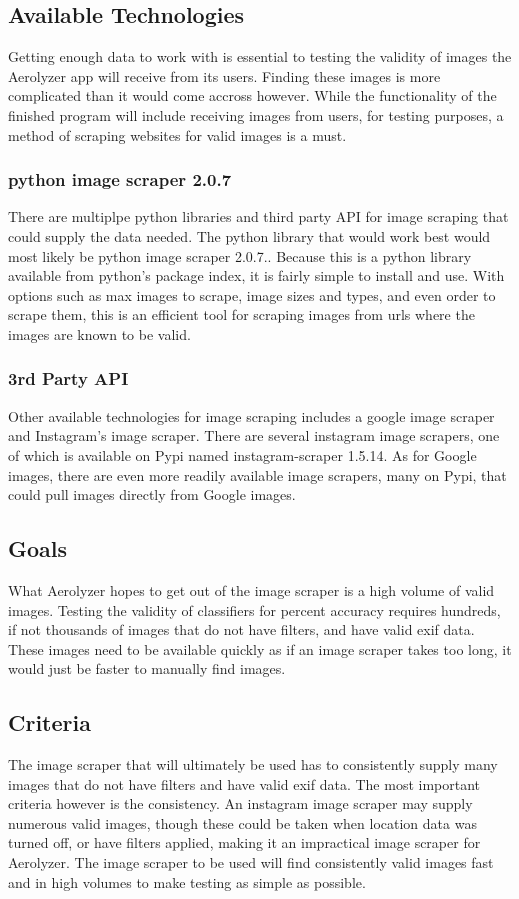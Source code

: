 \documentclass[onecolumn, draftclsnofoot,10pt, compsoc]{IEEEtran}
\begin{document}
\begin{singlespace}
\subsection{Available Technologies}
Getting enough data to work with is essential to testing the validity of images the Aerolyzer app will receive from its users. Finding these images is more complicated than it would come accross however. While the functionality of the finished program will include receiving images from users, for testing purposes, a method of scraping websites for valid images is a must. \cite{img}

\subsubsection{python image scraper 2.0.7}
There are multiplpe python libraries and third party API for image scraping that could supply the data needed. The python library that would work best would most likely be python image scraper 2.0.7.. Because this is a python library available from python's package index, it is fairly simple to install and use. With options such as max images to scrape, image sizes and types, and even order to scrape them, this is an efficient tool for scraping images from urls where the images are known to be valid.\cite{img}

\subsubsection{3rd Party API}
Other available technologies for image scraping includes a google image scraper and Instagram's image scraper. There are several instagram image scrapers, one of which is available on Pypi named instagram-scraper 1.5.14. As for Google images, there are even more readily available image scrapers, many on Pypi, that could pull images directly from Google images.\cite{img2}

\subsection{Goals}
What Aerolyzer hopes to get out of the image scraper is a high volume of valid images. Testing the validity of classifiers for percent accuracy requires hundreds, if not thousands of images that do not have filters, and have valid exif data. These images need to be available quickly as if an image scraper takes too long, it would just be faster to manually find images.

\subsection{Criteria}
The image scraper that will ultimately be used has to consistently supply many images that do not have filters and have valid exif data. The most important criteria however is the consistency. An instagram image scraper may supply numerous valid images, though these could be taken when location data was turned off, or have filters applied, making it an impractical image scraper for Aerolyzer. The image scraper to be used will find consistently valid images fast and in high volumes to make testing as simple as possible.  



\end{singlespace}
\end{document}

